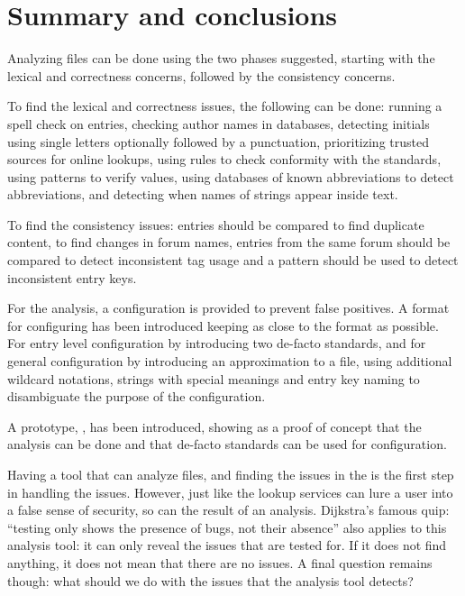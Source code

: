 \section{Summary and conclusions}

Analyzing {\bibtex} files can be done using the two phases suggested,
starting with the lexical and correctness concerns, followed by the
consistency concerns.

To find the lexical and correctness issues, the following can be done:
running a spell check on entries, checking author names in databases,
detecting initials using single letters optionally followed by a
punctuation, prioritizing trusted sources for online lookups, using
rules to check conformity with the standards, using patterns to verify
values, using databases of known abbreviations to detect
abbreviations, and detecting when names of strings appear inside text.

To find the consistency issues: entries should be compared to find
duplicate content, to find changes in forum names, entries from the
same forum should be compared to detect inconsistent tag usage and a
pattern should be used to detect inconsistent entry keys.

For the analysis, a configuration is provided to prevent false
positives.  A format for configuring has been introduced keeping as
close to the {\bibtex} format as possible.  For entry level
configuration by introducing two de-facto standards, and for general
configuration by introducing an approximation to a {\bibtex} file,
using additional wildcard notations, strings with special meanings and
entry key naming to disambiguate the purpose of the configuration.

A prototype, {\orangutan}, has been introduced, showing as a proof of
concept that the analysis can be done and that de-facto standards can
be used for configuration.

Having a tool that can analyze {\bibtex} files, and finding the issues
in the  is the first step in handling the issues.  However,
just like the lookup services can lure a user into a false sense of
security, so can the result of an analysis.  Dijkstra's famous quip:
``testing only shows the presence of bugs, not their absence'' also
applies to this analysis tool: it can only reveal the issues that are
tested for.  If it does not find anything, it does not mean that there
are no issues.  A final question remains though: what should we do
with the issues that the analysis tool detects?
